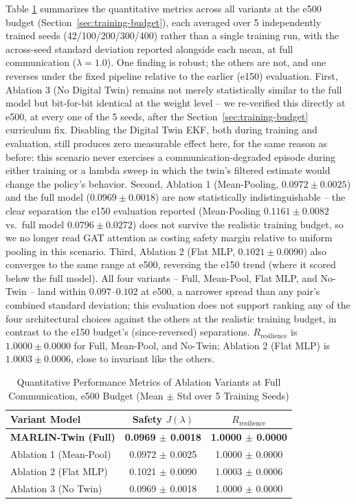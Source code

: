 \documentclass[journal,twocolumn,10pt]{IEEEtran}
\begin{document}
Table \ref{tab:ablation_table} summarizes the quantitative metrics across all variants at the e500 budget (Section~\ref{sec:training-budget}), each averaged over 5 independently trained seeds (42/100/200/300/400) rather than a single training run, with the across-seed standard deviation reported alongside each mean, at full communication ($\lambda=1.0$). One finding is robust; the others are not, and one reverses under the fixed pipeline relative to the earlier (e150) evaluation. First, Ablation 3 (No Digital Twin) remains not merely statistically similar to the full model but bit-for-bit identical at the weight level -- we re-verified this directly at e500, at every one of the 5 seeds, after the Section~\ref{sec:training-budget} curriculum fix. Disabling the Digital Twin EKF, both during training and evaluation, still produces zero measurable effect here, for the same reason as before: this scenario never exercises a communication-degraded episode during either training or a lambda sweep in which the twin's filtered estimate would change the policy's behavior. Second, Ablation 1 (Mean-Pooling, $0.0972 \pm 0.0025$) and the full model ($0.0969 \pm 0.0018$) are now statistically indistinguishable -- the clear separation the e150 evaluation reported (Mean-Pooling $0.1161 \pm 0.0082$ vs.\ full model $0.0796 \pm 0.0272$) does not survive the realistic training budget, so we no longer read GAT attention as costing safety margin relative to uniform pooling in this scenario. Third, Ablation 2 (Flat MLP, $0.1021 \pm 0.0090$) also converges to the same range at e500, reversing the e150 trend (where it scored below the full model). All four variants -- Full, Mean-Pool, Flat MLP, and No-Twin -- land within $0.097$--$0.102$ at e500, a narrower spread than any pair's combined standard deviation; this evaluation does not support ranking any of the four architectural choices against the others at the realistic training budget, in contrast to the e150 budget's (since-reversed) separations. $R_{\text{resilience}}$ is $1.0000 \pm 0.0000$ for Full, Mean-Pool, and No-Twin; Ablation 2 (Flat MLP) is $1.0003 \pm 0.0006$, close to invariant like the others.

\begin{table}[h]
\caption{Quantitative Performance Metrics of Ablation Variants at Full Communication, e500 Budget (Mean $\pm$ Std over 5 Training Seeds)}
\label{tab:ablation_table}
\centering
\begin{tabular}{lcc}
\toprule
\textbf{Variant Model} & \textbf{Safety $J(\lambda)$} & \textbf{$R_{\text{resilience}}$} \\
\midrule
\textbf{MARLIN-Twin (Full)} & \textbf{0.0969 $\pm$ 0.0018} & \textbf{1.0000 $\pm$ 0.0000} \\
Ablation 1 (Mean-Pool) & 0.0972 $\pm$ 0.0025 & 1.0000 $\pm$ 0.0000 \\
Ablation 2 (Flat MLP) & 0.1021 $\pm$ 0.0090 & 1.0003 $\pm$ 0.0006 \\
Ablation 3 (No Twin) & 0.0969 $\pm$ 0.0018 & 1.0000 $\pm$ 0.0000 \\
\bottomrule
\end{tabular}
\end{table}
\end{document}
